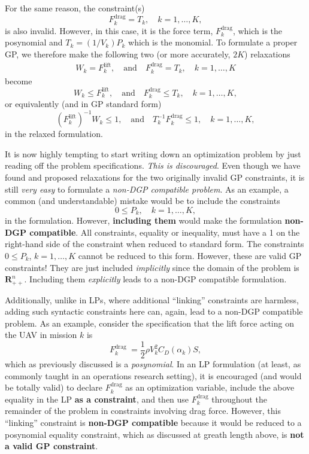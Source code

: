 \documentclass[12pt,reqno]{article}
\theoremstyle{definition}
\numberwithin{equation}{section}
\begin{document}
    For the same reason, the constraint(s)
    \[F_k^{\mathrm{drag}} = T_k, \quad k=1, \ldots, K,\]
    is also invalid. However, in this case, it is the force term, $F_{k}^{\mathrm{drag}}$, which is the posynomial
    and $T_k = (1/V_k)P_k$ which is the monomial. To formulate a proper GP, we therefore make the following two (or more accurately, $2K$) relaxations
    \[\begin{aligned}
        W_k = F_{k}^{\mathrm{lift}}, \quad \text{and} \quad F_{k}^{\mathrm{drag}} = T_k, \quad k=1, \ldots, K
    \end{aligned}\]
    become
    \[
        W_k \le F_{k}^{\mathrm{lift}}, \quad \text{and} \quad F_{k}^{\mathrm{drag}} \le T_k, \quad k=1, \ldots, K, \]
    or equivalently (and in GP standard form)
        \[\left(F_{k}^{\mathrm{lift}} \right)^{-1} W_k \le 1, \quad \text{and} \quad T_k^{-1}F_{k}^{\mathrm{drag}} \le 1, \quad k=1, \ldots, K,
    \]
    in the relaxed formulation.

    It is now highly tempting to start writing down an optimization problem by just reading off the
    problem specifications. \textit{This is discouraged}. Even though we have found and proposed relaxations
    for the two originally invalid GP constraints, it is still \textit{very easy}
    to formulate a \textit{non-DGP compatible problem}. As an example, a common (and understandable) mistake
    would be to include the constraints
    \[0 \le P_k, \quad k=1, \ldots, K,\]
    in the formulation. However, \textbf{including them} would make the formulation \textbf{non-DGP compatible}.
    All constraints, equality or inequality, must have a 1 on the right-hand side of the constraint when reduced to standard form.
    The constraints $0 \le P_k$, $k=1, \ldots, K$ cannot be reduced to this form.
    However, these are valid GP constraints! They are just included \textit{implicitly}
    since the domain of the problem is $\mathbf{R}^n_{++}$. Including them \textit{explicitly} leads to a non-DGP compatible
    formulation.
    
    Additionally, unlike in LPs, where additional ``linking'' constraints are harmless,
    adding such syntactic constraints here can, again, lead to a non-DGP compatible problem. As an example,
    consider the specification that the lift force acting on the UAV in mission $k$ is
    \[F_k^{\text {drag }}=\frac{1}{2} \rho V_k^2 C_D\left(\alpha_k\right) S,\]
    which as previously discussed is a \textit{posynomial}. In an LP formulation (at least, as commonly
    taught in an operations research setting), it is encouraged (and would be totally valid) to declare $F_k^{\mathrm{drag}}$
    as an optimization variable, include the above equality in the LP \textbf{as a constraint}, and then use $F_k^{\mathrm{drag}}$
    throughout the remainder of the problem in constraints involving drag force. However,
    this ``linking'' constraint is \textbf{non-DGP compatible} because it would be reduced to a posynomial equality constraint,
    which as discussed at greath length above, is \textbf{not a valid GP constraint}. 
    
\end{document}
